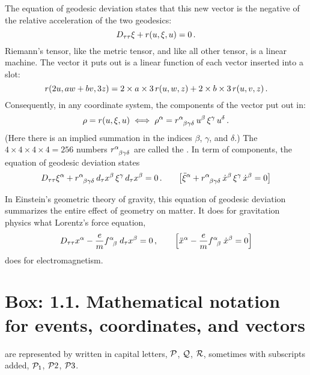 The equation of geodesic deviation states that this new vector is the negative of the relative acceleration of the two geodesics:
%
\begin{equation*}
  D_{\tau\tau}\svec + \riemann\vat{\vel,\svec,\vel} = 0\,.
\end{equation*}
%
Riemann's tensor, like the metric tensor, and like all other tensor, is a linear machine. The vector it puts out is a linear function of each vector inserted into a slot:
%
\begin{equation*}
  \riemann\vat{2u, aw + bv, 3z} = 2\times a\times 3\,\riemann\vat{u,w,z} + 2\times b\times 3\,\riemann\vat{u,v,z}\,.
\end{equation*}
%
Consequently, in any coordinate system, the components of the vector put out in:
%
\begin{equation*}
  \rho = \riemann\vat{\vel,\svec,\vel}
  \iff
  \tvec\rho\alpha = \triemann\alpha\beta\gamma\delta\,\tvec\vel\beta\,\tvec\svec\gamma\,\tvec\vel\delta\,.
\end{equation*}
%
(Here there is an implied summation in the indices $\beta$, $\gamma$, and $\delta$.) The $4\times 4\times 4\times 4 = 256$ numbers $\triemann\alpha\beta\gamma\delta$ are called the . In term of components, the equation of geodesic deviation states
%
\begin{equation*}
  D_{\tau\tau}\tvec\svec\alpha + \triemann\alpha\beta\gamma\delta\,d_\tau\tvec\pos\beta\,\tvec\svec\gamma\,d_\tau\tvec\pos\beta = 0\,.
  \qquad
  \mleft\lbrack
    \tvec{\ddt\svec}\alpha + \triemann\alpha\beta\gamma\delta\,\tvec{\dt\pos}\beta\,\tvec\svec\gamma\,\tvec{\dt\pos}\beta = 0
  \mright\rbrack
\end{equation*}

In Einstein's geometric theory of gravity, this equation of geodesic deviation summarizes the entire effect of geometry on matter. It does for gravitation physics what Lorentz's force equation,
%
\begin{equation*}
  D_{\tau\tau}\tvec\pos\alpha - \dfrac{\echarge}{\mass}\tensor{\farad}{^\alpha_\beta}\,d_\tau\tvec\pos\beta = 0\,,
  \qquad
  \mleft\lbrack
    \tvec{\ddt\pos}\alpha - \dfrac{\echarge}{\mass}\tensor{\farad}{^\alpha_\beta}\,\tvec{\dt\pos}\beta = 0
  \mright\rbrack
\end{equation*}
%
does for electromagnetism.


\section{Box: 1.1. Mathematical notation for events, coordinates, and vectors}
%
 are represented by  written in capital letters, $\event P$, $\event Q$, $\event R$, sometimes with subscripts added, $\event P_1$, $\event P2$, $\event P3$.

